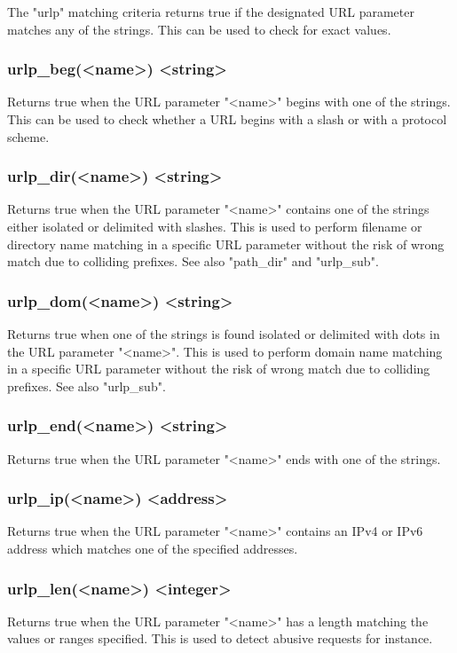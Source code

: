   The "urlp" matching criteria returns true if the designated URL parameter
  matches any of the strings. This can be used to check for exact values.

\subsubsection[urlp\_beg]{urlp\_beg(<name>) <string>}
  Returns true when the URL parameter "<name>" begins with one of the strings.
  This can be used to check whether a URL begins with a slash or with a
  protocol scheme.

\subsubsection[urlp\_dir]{urlp\_dir(<name>) <string>}
  Returns true when the URL parameter "<name>" contains one of the strings
  either isolated or delimited with slashes. This is used to perform filename
  or directory name matching in a specific URL parameter without the risk of
  wrong match due to colliding prefixes. See also "path\_dir" and "urlp\_sub".

\subsubsection[urlp\_dom]{urlp\_dom(<name>) <string>}
  Returns true when one of the strings is found isolated or delimited with dots
  in the URL parameter "<name>". This is used to perform domain name matching
  in a specific URL parameter without the risk of wrong match due to colliding
  prefixes. See also "urlp\_sub".

\subsubsection[urlp\_end]{urlp\_end(<name>) <string>}
  Returns true when the URL parameter "<name>" ends with one of the strings.

\subsubsection[urlp\_ip]{urlp\_ip(<name>) <address>}
  Returns true when the URL parameter "<name>" contains an IPv4 or IPv6 address
  which matches one of the specified addresses.

\subsubsection[urlp\_len]{urlp\_len(<name>) <integer>}
  Returns true when the URL parameter "<name>" has a length matching the values
  or ranges specified. This is used to detect abusive requests for instance.

